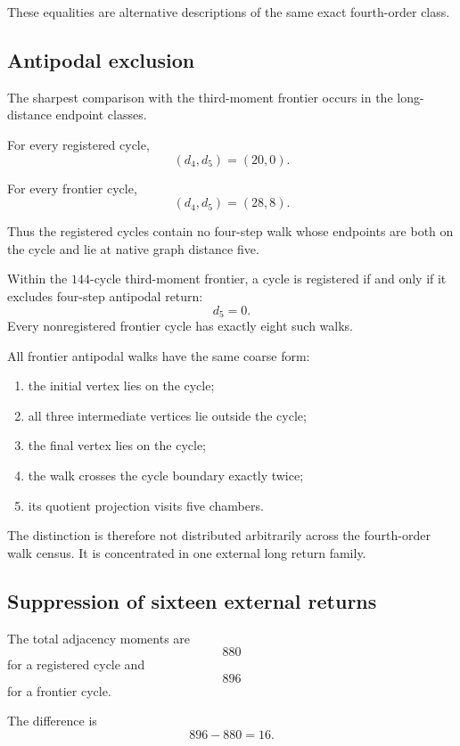 These equalities are alternative descriptions of the same exact
fourth-order class.

\subsection{Antipodal exclusion}

The sharpest comparison with the third-moment frontier occurs in the
long-distance endpoint classes.

For every registered cycle,
\[
(d_4,d_5)=(20,0).
\]

For every frontier cycle,
\[
(d_4,d_5)=(28,8).
\]

Thus the registered cycles contain no four-step walk whose endpoints
are both on the cycle and lie at native graph distance five.

\begin{theorem}
Within the \(144\)-cycle third-moment frontier, a cycle is registered
if and only if it excludes four-step antipodal return:
\[
d_5=0.
\]
Every nonregistered frontier cycle has exactly eight such walks.
\end{theorem}

All frontier antipodal walks have the same coarse form:

\begin{enumerate}
    \item the initial vertex lies on the cycle;
    \item all three intermediate vertices lie outside the cycle;
    \item the final vertex lies on the cycle;
    \item the walk crosses the cycle boundary exactly twice;
    \item its quotient projection visits five chambers.
\end{enumerate}

The distinction is therefore not distributed arbitrarily across the
fourth-order walk census. It is concentrated in one external long
return family.

\subsection{Suppression of sixteen external returns}

The total adjacency moments are
\[
880
\]
for a registered cycle and
\[
896
\]
for a frontier cycle.

The difference is
\[
896-880=16.
\]

